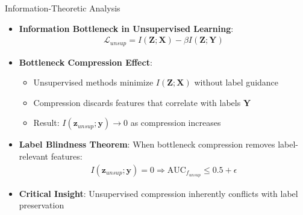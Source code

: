 \documentclass[aspectratio=169]{beamer}
\begin{document}
\begin{frame}{Information-Theoretic Analysis}
\begin{itemize}
    \item \textbf{Information Bottleneck in Unsupervised Learning}:
    \begin{align}
        \mathcal{L}_{unsup} = I(\mathbf{Z}; \mathbf{X}) - \beta I(\mathbf{Z}; \mathbf{Y})
    \end{align}
    \item \textbf{Bottleneck Compression Effect}:
    \begin{itemize}
        \item Unsupervised methods minimize $I(\mathbf{Z}; \mathbf{X})$ without label guidance
        \item Compression discards features that correlate with labels $\mathbf{Y}$
        \item Result: $I(\mathbf{z}_{unsup}; \mathbf{y}) \rightarrow 0$ as compression increases
    \end{itemize}
    \item \textbf{Label Blindness Theorem}: When bottleneck compression removes label-relevant features:
    \begin{align}
        I(\mathbf{z}_{unsup}; \mathbf{y}) = 0 \Rightarrow \text{AUC}_{f_{unsup}} \leq 0.5 + \epsilon
    \end{align}
    \item \textbf{Critical Insight}: Unsupervised compression inherently conflicts with label preservation
\end{itemize}
\end{frame}
\end{document}
